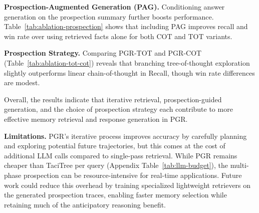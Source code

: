 \textbf{Prospection-Augmented Generation (PAG).} Conditioning answer generation on the prospection summary further boosts performance. Table~\ref{tab:ablation-prospection} shows that including PAG improves recall and win rate over using retrieved facts alone for both COT and TOT variants.

\textbf{Prospection Strategy.} Comparing PGR-TOT and PGR-COT (Table~\ref{tab:ablation-tot-cot}) reveals that branching tree-of-thought exploration slightly outperforms linear chain-of-thought in Recall, though win rate differences are modest. 

Overall, the results indicate that iterative retrieval, prospection-guided generation, and the choice of prospection strategy each contribute to more effective memory retrieval and response generation in PGR.


\textbf{Limitations.}
PGR’s iterative process improves accuracy by carefully planning and exploring potential future trajectories, but this comes at the cost of additional LLM calls compared to single-pass retrieval. While PGR remains cheaper than TaciTree per query (Appendix Table~\ref{tab:llm-budget}), the multi-phase prospection can be resource-intensive for real-time applications. Future work could reduce this overhead by training specialized lightweight retrievers on the generated prospection traces, enabling faster memory selection while retaining much of the anticipatory reasoning benefit. 
